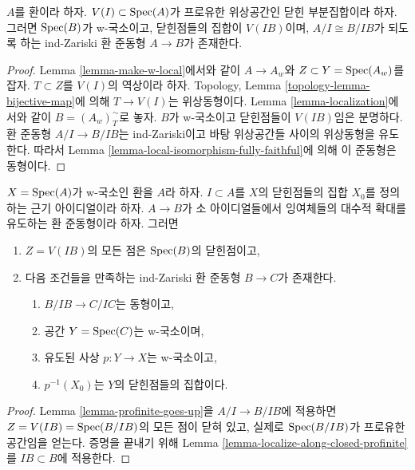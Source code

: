 \begin{lemma}
\label{lemma-localize-along-closed-profinite}
$A$를 환이라 하자. $V(I) \subset \mathop{\mathrm{Spec}}(A)$가 프로유한 위상공간인
닫힌 부분집합이라 하자. 그러면 $\mathop{\mathrm{Spec}}(B)$가 w-국소이고,
닫힌점들의 집합이 $V(IB)$이며, $A/I \cong B/IB$가 되도록 하는
ind-Zariski 환 준동형 $A \to B$가 존재한다.
\end{lemma}

\begin{proof}
Lemma \ref{lemma-make-w-local}에서와 같이
$A \to A_w$와 $Z \subset Y = \mathop{\mathrm{Spec}}(A_w)$를 잡자.
$T \subset Z$를 $V(I)$의 역상이라 하자.
Topology, Lemma \ref{topology-lemma-bijective-map}에 의해
$T \to V(I)$는 위상동형이다.
Lemma \ref{lemma-localization}에서와 같이 $B = (A_w)_T^\sim$로 놓자.
$B$가 w-국소이고 닫힌점들이 $V(IB)$임은 분명하다.
환 준동형 $A/I \to B/IB$는 ind-Zariski이고
바탕 위상공간들 사이의 위상동형을 유도한다.
따라서 Lemma \ref{lemma-local-isomorphism-fully-faithful}에 의해
이 준동형은 동형이다.
\end{proof}

\begin{lemma}
\label{lemma-w-local-algebraic-residue-field-extensions}
$X = \mathop{\mathrm{Spec}}(A)$가 w-국소인 환을 $A$라 하자.
$I \subset A$를 $X$의 닫힌점들의 집합 $X_0$를 정의하는
근기 아이디얼이라 하자.
$A \to B$가 소 아이디얼들에서 잉여체들의 대수적 확대를 유도하는
환 준동형이라 하자. 그러면
\begin{enumerate}
\item $Z = V(IB)$의 모든 점은 $\mathop{\mathrm{Spec}}(B)$의 닫힌점이고,
\item 다음 조건들을 만족하는 ind-Zariski 환 준동형 $B \to C$가 존재한다.
\begin{enumerate}
\item $B/IB \to C/IC$는 동형이고,
\item 공간 $Y = \mathop{\mathrm{Spec}}(C)$는 w-국소이며,
\item 유도된 사상 $p : Y \to X$는 w-국소이고,
\item $p^{-1}(X_0)$는 $Y$의 닫힌점들의 집합이다.
\end{enumerate}
\end{enumerate}
\end{lemma}

\begin{proof}
Lemma \ref{lemma-profinite-goes-up}을 $A/I \to B/IB$에 적용하면
$Z = V(IB) = \mathop{\mathrm{Spec}}(B/IB)$의 모든 점이 닫혀 있고,
실제로 $\mathop{\mathrm{Spec}}(B/IB)$가 프로유한 공간임을 얻는다.
증명을 끝내기 위해 Lemma \ref{lemma-localize-along-closed-profinite}를
$IB \subset B$에 적용한다.
\end{proof}





